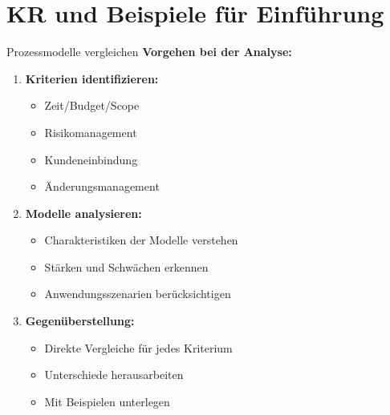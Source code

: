 \section{KR und Beispiele für Einführung}

\begin{KR}{Prozessmodelle vergleichen}
\textbf{Vorgehen bei der Analyse:}
\begin{enumerate}
    \item \textbf{Kriterien identifizieren:}
    \begin{itemize}
        \item Zeit/Budget/Scope
        \item Risikomanagement
        \item Kundeneinbindung
        \item Änderungsmanagement
    \end{itemize}
    
    \item \textbf{Modelle analysieren:}
    \begin{itemize}
        \item Charakteristiken der Modelle verstehen
        \item Stärken und Schwächen erkennen
        \item Anwendungsszenarien berücksichtigen 
    \end{itemize}
    
    \item \textbf{Gegenüberstellung:}
    \begin{itemize}
        \item Direkte Vergleiche für jedes Kriterium
        \item Unterschiede herausarbeiten
        \item Mit Beispielen unterlegen
    \end{itemize}
\end{enumerate}
\end{KR}

